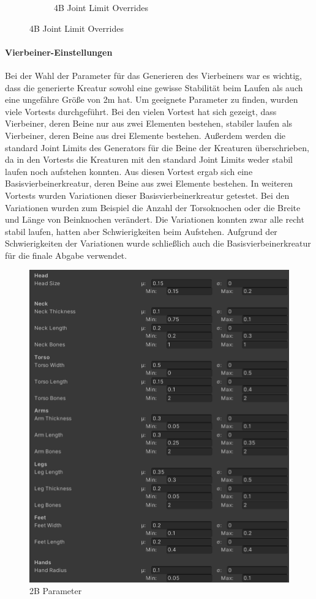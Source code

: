 \begin{figure}
\begin{subfigure}[b]{0.45\textwidth}
        \caption{4B Joint Limit Overrides}\label{fig:4B_joint_limit_overrides}
    \end{subfigure}
\end{figure}

\paragraph{Vierbeiner-Einstellungen}
Bei der Wahl der Parameter für das Generieren des Vierbeiners war es wichtig, dass die generierte Kreatur sowohl eine gewisse Stabilität beim Laufen als auch eine ungefähre Größe von 2m hat. Um geeignete Parameter zu finden, wurden viele Vortests durchgeführt. Bei den vielen Vortest hat sich gezeigt, dass Vierbeiner, deren Beine nur aus zwei Elementen bestehen, stabiler laufen als Vierbeiner, deren Beine aus drei Elemente bestehen. Außerdem werden die standard Joint Limits des Generators für die Beine der Kreaturen überschrieben, da in den Vortests die Kreaturen mit den standard Joint Limits weder stabil laufen noch aufstehen konnten. Aus diesen Vortest ergab sich eine Basisvierbeinerkreatur, deren Beine aus zwei Elemente bestehen. In weiteren Vortests wurden Variationen dieser Basisvierbeinerkreatur getestet. Bei den Variationen wurden zum Beispiel die Anzahl der Torsoknochen oder die Breite und Länge von Beinknochen verändert. Die Variationen konnten zwar alle recht stabil laufen, hatten aber Schwierigkeiten beim Aufstehen. Aufgrund der Schwierigkeiten der Variationen wurde schließlich auch die Basisvierbeinerkreatur für die finale Abgabe verwendet. 

\begin{figure}[ht]
    \centering
    \includegraphics[width=0.5\linewidth]{resources/img/2bSettings}
    \caption{2B Parameter}
    \label{fig:2B_creature_settings}
\end{figure}

